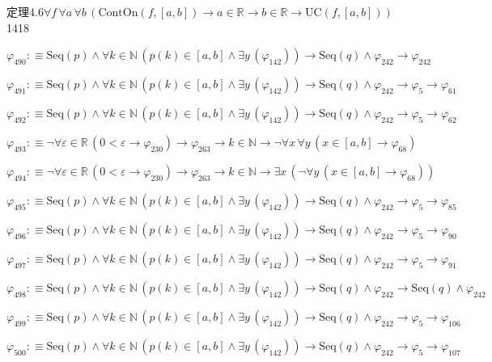 \begin{fullproof}{定理4.6}{$\forall f\,\forall a\,\forall b\,(\mathrm{ContOn}(f,[a,b]) \to a \in \mathbb{R} \to b \in \mathbb{R} \to \mathrm{UC}(f,[a,b]))$}{1418}
\begin{abbrevlist}
\item $\varphi_{490} :\equiv \mathrm{Seq}(p) \land \forall k \in \mathbb{N}\,(p(k) \in [a,b] \land \exists y\,(\varphi_{142})) \to \mathrm{Seq}(q) \land \varphi_{242} \to \varphi_{242}$
\item $\varphi_{491} :\equiv \mathrm{Seq}(p) \land \forall k \in \mathbb{N}\,(p(k) \in [a,b] \land \exists y\,(\varphi_{142})) \to \mathrm{Seq}(q) \land \varphi_{242} \to \varphi_{5} \to \varphi_{61}$
\item $\varphi_{492} :\equiv \mathrm{Seq}(p) \land \forall k \in \mathbb{N}\,(p(k) \in [a,b] \land \exists y\,(\varphi_{142})) \to \mathrm{Seq}(q) \land \varphi_{242} \to \varphi_{5} \to \varphi_{62}$
\item $\varphi_{493} :\equiv \neg \forall \varepsilon \in \mathbb{R}\,(0 < \varepsilon \to \varphi_{230}) \to \varphi_{263} \to k \in \mathbb{N} \to \neg \forall x\,\forall y\,(x \in [a,b] \to \varphi_{68})$
\item $\varphi_{494} :\equiv \neg \forall \varepsilon \in \mathbb{R}\,(0 < \varepsilon \to \varphi_{230}) \to \varphi_{263} \to k \in \mathbb{N} \to \exists x\,(\neg \forall y\,(x \in [a,b] \to \varphi_{68}))$
\item $\varphi_{495} :\equiv \mathrm{Seq}(p) \land \forall k \in \mathbb{N}\,(p(k) \in [a,b] \land \exists y\,(\varphi_{142})) \to \mathrm{Seq}(q) \land \varphi_{242} \to \varphi_{5} \to \varphi_{85}$
\item $\varphi_{496} :\equiv \mathrm{Seq}(p) \land \forall k \in \mathbb{N}\,(p(k) \in [a,b] \land \exists y\,(\varphi_{142})) \to \mathrm{Seq}(q) \land \varphi_{242} \to \varphi_{5} \to \varphi_{90}$
\item $\varphi_{497} :\equiv \mathrm{Seq}(p) \land \forall k \in \mathbb{N}\,(p(k) \in [a,b] \land \exists y\,(\varphi_{142})) \to \mathrm{Seq}(q) \land \varphi_{242} \to \varphi_{5} \to \varphi_{91}$
\item $\varphi_{498} :\equiv \mathrm{Seq}(p) \land \forall k \in \mathbb{N}\,(p(k) \in [a,b] \land \exists y\,(\varphi_{142})) \to \mathrm{Seq}(q) \land \varphi_{242} \to \mathrm{Seq}(q) \land \varphi_{242}$
\item $\varphi_{499} :\equiv \mathrm{Seq}(p) \land \forall k \in \mathbb{N}\,(p(k) \in [a,b] \land \exists y\,(\varphi_{142})) \to \mathrm{Seq}(q) \land \varphi_{242} \to \varphi_{5} \to \varphi_{106}$
\item $\varphi_{500} :\equiv \mathrm{Seq}(p) \land \forall k \in \mathbb{N}\,(p(k) \in [a,b] \land \exists y\,(\varphi_{142})) \to \mathrm{Seq}(q) \land \varphi_{242} \to \varphi_{5} \to \varphi_{107}$

\end{abbrevlist}
\end{fullproof}
